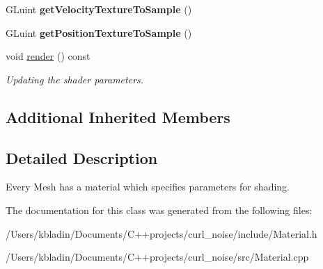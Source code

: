 \begin{DoxyCompactItemize}
\item 
\hypertarget{class_point_cloud_material_a1b811fb208c7ce004040ad9b70d1c631}{G\-Luint {\bfseries get\-Velocity\-Texture\-To\-Sample} ()}\label{class_point_cloud_material_a1b811fb208c7ce004040ad9b70d1c631}

\item 
\hypertarget{class_point_cloud_material_a93edc967ae22fb1035ad1ed26c4138bd}{G\-Luint {\bfseries get\-Position\-Texture\-To\-Sample} ()}\label{class_point_cloud_material_a93edc967ae22fb1035ad1ed26c4138bd}

\item 
\hypertarget{class_point_cloud_material_a0e91267910c5f90932c8596f316a912d}{void \hyperlink{class_point_cloud_material_a0e91267910c5f90932c8596f316a912d}{render} () const }\label{class_point_cloud_material_a0e91267910c5f90932c8596f316a912d}

\begin{DoxyCompactList}\small\item\em Updating the shader parameters. \end{DoxyCompactList}\end{DoxyCompactItemize}
\subsection*{Additional Inherited Members}


\subsection{Detailed Description}
Every Mesh has a material which specifies parameters for shading. 

The documentation for this class was generated from the following files\-:\begin{DoxyCompactItemize}
\item 
/\-Users/kbladin/\-Documents/\-C++projects/curl\-\_\-noise/include/Material.\-h\item 
/\-Users/kbladin/\-Documents/\-C++projects/curl\-\_\-noise/src/Material.\-cpp\end{DoxyCompactItemize}
